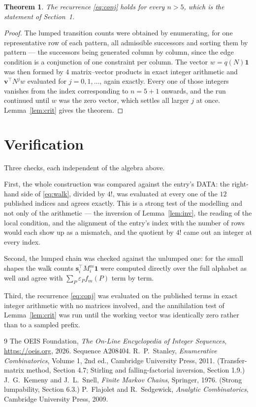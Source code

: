 \documentclass[11pt,a4paper]{article}
\theoremstyle{plain}
\newtheorem{theorem}{Theorem}
\theoremstyle{definition}
\begin{document}
\begin{theorem}
The recurrence \eqref{eq:conj} holds for every $n>5$, which is the statement of
Section~1.
\end{theorem}

\begin{proof}
The lumped transition counts were obtained by enumerating, for one representative row of
each pattern, all admissible successors and sorting them by pattern --- the successors being
generated column by column, since the edge condition is a conjunction of one constraint per
column. The vector $w=q(N)\mathbf{1}$ was then formed by $4$ matrix--vector products
in exact integer arithmetic and $\mathbf{v}^{\!\top}N^{j}w$ evaluated for
$j=0,1,\dots$, again exactly. Every one of those integers vanishes from the index
corresponding to $n=5+1$ onwards, and the run continued until $w$ was the zero vector,
which settles all larger $j$ at once. Lemma~\ref{lem:crit} gives the theorem.
\end{proof}

\section{Verification}

Three checks, each independent of the algebra above.

First, the whole construction was compared against the entry's DATA: the right-hand side of
\eqref{eq:walk}, divided by $4!$, was evaluated at every one of the $12$
published indices and agrees exactly. This is a strong test of the modelling and not only of
the arithmetic --- the inversion of Lemma~\ref{lem:inv}, the reading of the local
condition, and the alignment of the entry's index with the number of rows would each
show up as a mismatch, and the quotient by $4!$ came out an integer at every index.

Second, the lumped chain was checked against the unlumped one: for the small shapes the walk
counts $\mathbf{s}_i^{\!\top}M_i^{m}\mathbf{1}$ were computed directly over the full
alphabet as well and agree with $\sum_P\varepsilon_Pf_m(P)$ term by term.

Third, the recurrence \eqref{eq:conj} was evaluated on the published terms in exact integer
arithmetic with no matrices involved, and the annihilation test of Lemma~\ref{lem:crit} was
run until the working vector was identically zero rather than to a sampled prefix.

\begin{thebibliography}{9}
 The OEIS Foundation, \emph{The On-Line Encyclopedia of Integer
Sequences}, \url{https://oeis.org}, 2026. Sequence A208404.
 R.~P.~Stanley, \emph{Enumerative Combinatorics}, Volume 1, 2nd ed.,
Cambridge University Press, 2011. (Transfer-matrix method, Section 4.7; Stirling and
falling-factorial inversion, Section 1.9.)
 J.~G.~Kemeny and J.~L.~Snell, \emph{Finite Markov Chains}, Springer,
1976. (Strong lumpability, Section 6.3.)
 P.~Flajolet and R.~Sedgewick, \emph{Analytic Combinatorics}, Cambridge
University Press, 2009.
\end{thebibliography}
\end{document}
